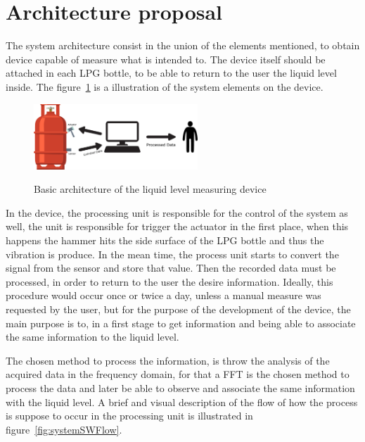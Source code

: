 \section{Architecture proposal}
The system architecture consist in the union of the elements mentioned, to obtain device capable of measure what is intended to. The device itself should be attached in each LPG bottle, to be able to return to the user the liquid level inside. The figure~\ref{fig:systemArch} is a illustration of the system elements on the device.

\begin{figure}[]
    \centering
    \includegraphics[width=0.55\textwidth]{Chapters/3CHP/Images/bottleBaseAct.eps}
    \caption{Basic architecture of the liquid level measuring device}{}
    \label{fig:systemArch}
\end{figure}
In the device, the processing unit is responsible for the control of the system as well, the unit is responsible for trigger the actuator in the first place, when this happens the hammer hits the side surface of the LPG bottle and thus the vibration is produce. In the mean time, the process unit starts to convert the signal from the sensor and store that value. Then the recorded data must be processed, in order to return to the user the desire information. Ideally, this procedure would occur once or twice a day, unless a manual measure was requested by the user, but for the purpose of the development of the device, the main purpose is to, in a first stage to get information and being able to associate the same information to the liquid level.

The chosen method to process the information, is throw the analysis of the acquired data in the frequency domain, for that a FFT is the chosen method to process the data and later be able to observe and associate the same information with the liquid level. A brief and visual description of the flow of how the process is suppose to occur in the processing unit is illustrated in figure~\ref{fig:systemSWFlow}.

